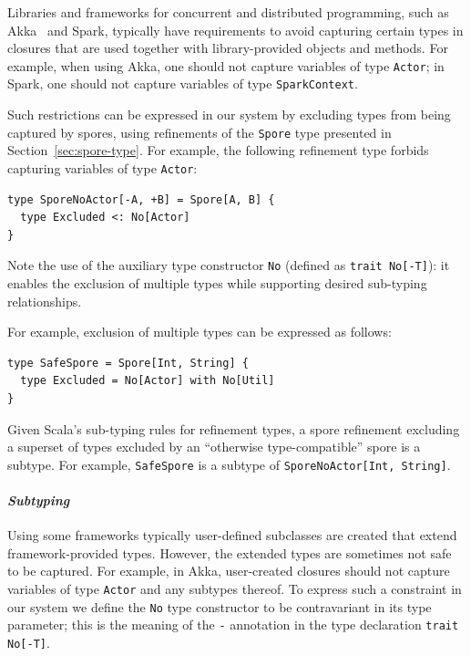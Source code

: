 \documentclass[runningheads]{llncs}
\begin{document}
\begin{sloppypar}
Libraries and frameworks for concurrent and distributed programming, such as Akka~\cite{Akka} and Spark, typically have requirements to avoid capturing certain types in closures that are used together with library-provided objects and methods. For example, when using Akka, one should not capture variables of type \verb|Actor|; in Spark, one should not capture variables of type \verb|SparkContext|.

Such restrictions can be expressed in our system by excluding types from being
captured by spores, using refinements of the \verb|Spore| type presented in
Section~\ref{sec:spore-type}. For example, the following refinement type
forbids capturing variables of type \verb|Actor|:

\begin{lstlisting}
type SporeNoActor[-A, +B] = Spore[A, B] {
  type Excluded <: No[Actor]
}
\end{lstlisting}
\noindent
Note the use of the auxiliary type constructor \verb|No| (defined as \lstinline{trait No[-T]}): it enables
the exclusion of multiple types while supporting desired sub-typing relationships.



\noindent For example, exclusion of multiple types can be expressed as follows:

\begin{lstlisting}
type SafeSpore = Spore[Int, String] {
  type Excluded = No[Actor] with No[Util]
}
\end{lstlisting}

\noindent Given Scala's sub-typing rules for refinement types, a spore refinement
excluding a superset of types excluded by an ``otherwise type-compatible''
spore is a subtype. For example, \verb|SafeSpore| is a subtype of
\verb|SporeNoActor[Int, String]|.

\paragraph{\textbf{\textit{Subtyping}}}

Using some frameworks typically user-defined subclasses are created that extend framework-provided types. However, the extended types are sometimes not safe to be captured. For example, in Akka, user-created closures should not capture variables of type \verb|Actor| and any subtypes thereof. To express such a constraint in our system we define the \verb|No| type constructor to be contravariant in its type parameter; this is the meaning of the \verb|-| annotation in the type declaration \verb|trait No[-T]|.


\end{sloppypar}
\end{document}
